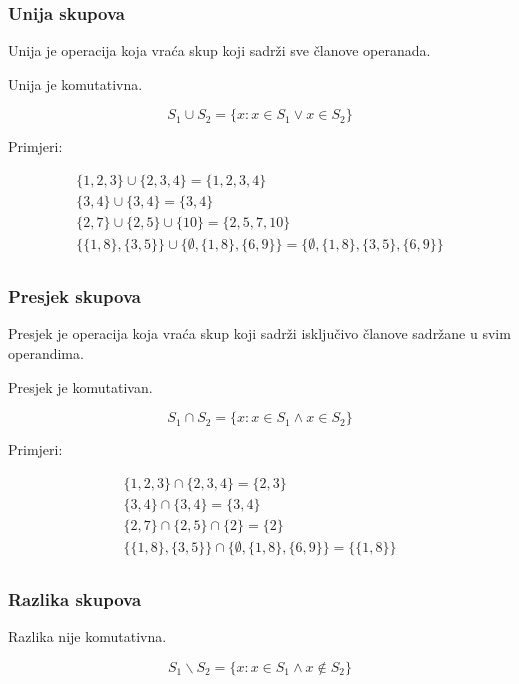 \subsubsection{Unija skupova}

Unija je operacija koja vraća skup koji sadrži sve članove operanada. 

Unija je komutativna.

$$
S_1 \cup S_2 = \{x: x \in S_1 \lor x \in S_2\}
$$

Primjeri:

\begin{gather*}
    \{1, 2, 3\} \cup \{2, 3, 4\} = \{1, 2, 3, 4\} \\
    \{3, 4\} \cup \{3, 4\} = \{3, 4\} \\
    \{2, 7\} \cup \{2, 5\} \cup \{10\} = \{2, 5, 7, 10\} \\
    \{\{1, 8\}, \{3, 5\}\} \cup \{\emptyset, \{1, 8\}, \{6, 9\}\} = \{\emptyset,\{1, 8\}, \{3, 5\}, \{6, 9\}\} \\
\end{gather*}

\subsubsection{Presjek skupova}

Presjek je operacija koja vraća skup koji sadrži isključivo članove sadržane u svim operandima. 

Presjek je komutativan.

$$
S_1 \cap S_2 = \{x: x \in S_1 \land x \in S_2\}
$$

Primjeri:

\begin{gather*}
    \{1, 2, 3\} \cap \{2, 3, 4\} = \{2, 3\} \\
    \{3, 4\} \cap \{3, 4\} = \{3, 4\} \\
    \{2, 7\} \cap \{2, 5\} \cap \{2\} = \{2\} \\
    \{\{1, 8\}, \{3, 5\}\} \cap \{\emptyset, \{1, 8\}, \{6, 9\}\} = \{\{1, 8\}\} \\
\end{gather*}

\subsubsection{Razlika skupova}

Razlika nije komutativna.

$$
S_1 \backslash S_2 = \{x: x \in S_1 \land x \notin S_2\}
$$


